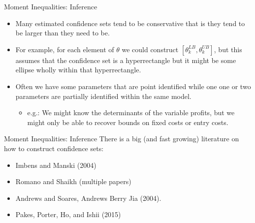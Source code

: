 \documentclass[xcolor=pdftex,dvipsnames,table,mathserif]{beamer}
\begin{document}
\begin{frame}{Moment Inequalities: Inference}
\begin{itemize}
\item Many estimated confidence sets tend to be \alert{conservative} that is they tend to be larger than they need to be.
\item For example, for each element of $\theta$ we could construct $[\theta_k^{LB},\theta_k^{UB}]$, but this assumes that the confidence set is a \alert{hyperrectangle} but it might be some ellipse wholly within that hyperrectangle.
\item Often we have some parameters that are \alert{point identified} while one one or two parameters are \alert{partially identified} within the same model.
\begin{itemize}
\item e.g.: We might know the determinants of the variable profits, but we might only be able to recover bounds on fixed costs or entry costs.
\end{itemize}
\end{itemize}
\end{frame}

\begin{frame}{Moment Inequalities: Inference}
There is a big (and fast growing) literature on how to construct confidence sets:
\begin{itemize}
\item Imbens and Manski (2004)
\item Romano and Shaikh (multiple papers)
\item Andrews and Soares, Andrews Berry Jia (2004).
\item Pakes, Porter, Ho, and Ishii (2015)
\end{itemize}
\end{frame}
\end{document}
